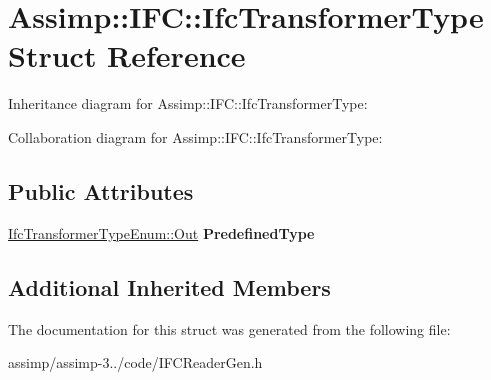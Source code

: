 \hypertarget{struct_assimp_1_1_i_f_c_1_1_ifc_transformer_type}{\section{Assimp\+:\+:I\+F\+C\+:\+:Ifc\+Transformer\+Type Struct Reference}
\label{struct_assimp_1_1_i_f_c_1_1_ifc_transformer_type}
}


Inheritance diagram for Assimp\+:\+:I\+F\+C\+:\+:Ifc\+Transformer\+Type\+:


Collaboration diagram for Assimp\+:\+:I\+F\+C\+:\+:Ifc\+Transformer\+Type\+:
\subsection*{Public Attributes}
\begin{DoxyCompactItemize}
\item 
\hypertarget{struct_assimp_1_1_i_f_c_1_1_ifc_transformer_type_a0ceebb872697a5e8be9374b26ef6cd7d}{\hyperlink{classboost_1_1shared__ptr}{Ifc\+Transformer\+Type\+Enum\+::\+Out} {\bfseries Predefined\+Type}}\label{struct_assimp_1_1_i_f_c_1_1_ifc_transformer_type_a0ceebb872697a5e8be9374b26ef6cd7d}

\end{DoxyCompactItemize}
\subsection*{Additional Inherited Members}


The documentation for this struct was generated from the following file\+:\begin{DoxyCompactItemize}
\item 
assimp/assimp-\/3../code/I\+F\+C\+Reader\+Gen.\+h\end{DoxyCompactItemize}

